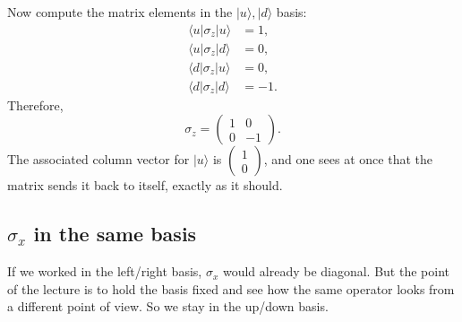Now compute the matrix elements in the \(|u\rangle,|d\rangle\) basis:
\begin{align}
\langle u|\sigma_z|u\rangle &= 1, \\
\langle u|\sigma_z|d\rangle &= 0, \\
\langle d|\sigma_z|u\rangle &= 0, \\
\langle d|\sigma_z|d\rangle &= -1.
\end{align}
Therefore,
\begin{equation}
\sigma_z=
\begin{pmatrix}
1 & 0 \\
0 & -1
\end{pmatrix}.
\end{equation}
The associated column vector for \(|u\rangle\) is \(\begin{pmatrix}1\\0\end{pmatrix}\), and one sees at once that the matrix sends it back to itself, exactly as it should.

\subsection{\texorpdfstring{\(\sigma_x\)}{sigma x} in the same basis}

If we worked in the left/right basis, \(\sigma_x\) would already be diagonal. But the point of the lecture is to hold the basis fixed and see how the same operator looks from a different point of view. So we stay in the up/down basis.

